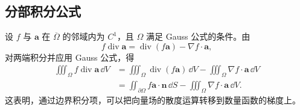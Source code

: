 \subsection*{分部积分公式}
设 $f$ 与 $\boldsymbol a$ 在 $\overline\Omega$ 的邻域内为 $C^1$，且 $\Omega$ 满足 Gauss 公式的条件。由
\[
f\operatorname{div}\boldsymbol a=\operatorname{div}(f\boldsymbol a)-\nabla f\cdot\boldsymbol a,
\]
对两端积分并应用 Gauss 公式，得
\begin{align*}
\iiint_\Omega f\operatorname{div}\boldsymbol a\,\dd V
&=\iiint_\Omega\operatorname{div}(f\boldsymbol a)\,\dd V
 -\iiint_\Omega\nabla f\cdot\boldsymbol a\,\dd V\\
&=\displaystyle\iint_{\partial\Omega}f\boldsymbol a\cdot\boldsymbol n\,\dd S
 -\iiint_\Omega\nabla f\cdot\boldsymbol a\,\dd V.
\end{align*}
这表明，通过边界积分项，可以把向量场的散度运算转移到数量函数的梯度上。
